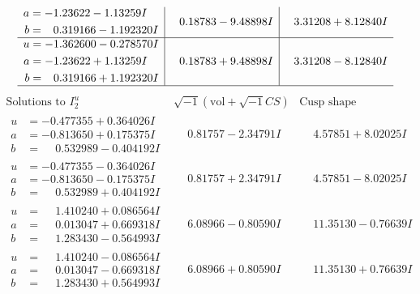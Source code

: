 \documentclass[1p]{elsarticle_modified}
\theoremstyle{definition}
\newcommand{\I}{\sqrt{-1}}
\begin{document}
$$\begin{array}{c|c|c}
\begin{aligned}
a &= -1.23622 - 1.13259 I \\
b &= \phantom{-}0.319166 - 1.192320 I\end{aligned}
 & \phantom{-}0.18783 - 9.48898 I & \phantom{-}3.31208 + 8.12840 I \\ \hline\begin{aligned}
u &= -1.362600 - 0.278570 I \\
a &= -1.23622 + 1.13259 I \\
b &= \phantom{-}0.319166 + 1.192320 I\end{aligned}
 & \phantom{-}0.18783 + 9.48898 I & \phantom{-}3.31208 - 8.12840 I\\
 \hline 
 \end{array}$$\newpage$$\begin{array}{c|c|c}  
\text{Solutions to }I^u_{2}& \I (\text{vol} + \sqrt{-1}CS) & \text{Cusp shape}\\
 \hline 
\begin{aligned}
u &= -0.477355 + 0.364026 I \\
a &= -0.813650 + 0.175375 I \\
b &= \phantom{-}0.532989 - 0.404192 I\end{aligned}
 & \phantom{-}0.81757 - 2.34791 I & \phantom{-}4.57851 + 8.02025 I \\ \hline\begin{aligned}
u &= -0.477355 - 0.364026 I \\
a &= -0.813650 - 0.175375 I \\
b &= \phantom{-}0.532989 + 0.404192 I\end{aligned}
 & \phantom{-}0.81757 + 2.34791 I & \phantom{-}4.57851 - 8.02025 I \\ \hline\begin{aligned}
u &= \phantom{-}1.410240 + 0.086564 I \\
a &= \phantom{-}0.013047 + 0.669318 I \\
b &= \phantom{-}1.283430 - 0.564993 I\end{aligned}
 & \phantom{-}6.08966 - 0.80590 I & \phantom{-}11.35130 - 0.76639 I \\ \hline\begin{aligned}
u &= \phantom{-}1.410240 - 0.086564 I \\
a &= \phantom{-}0.013047 - 0.669318 I \\
b &= \phantom{-}1.283430 + 0.564993 I\end{aligned}
 & \phantom{-}6.08966 + 0.80590 I & \phantom{-}11.35130 + 0.76639 I \\ \hline\begin{aligned}

\end{aligned}
\end{array}$$
\end{document}
